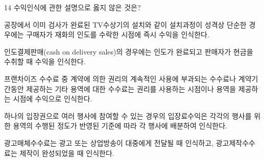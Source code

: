 \begin{question}{14}
수익인식에 관한 설명으로 옳지 않은 것은?
\begin{choices}
  \item 공장에서 이미 검사가 완료된 TV수상기의 설치와 같이 설치과정이 성격상 단순한 경우에는 구매자가 재화의 인도를 수락한 시점에 즉시 수익을 인식한다.
  \item 인도결제판매(cash on delivery sales)의 경우에는 인도가 완료되고 판매자가 현금을 수취할 때 수익을 인식한다.
  \item 프랜차이즈 수수료 중 계약에 의한 권리의 계속적인 사용에 부과되는 수수료나 계약기간동안 제공하는 기타 용역에 대한 수수료는 권리를 사용하는 시점이나 용역을 제공하는 시점에 수익으로 인식한다.
  \item 하나의 입장권으로 여러 행사에 참여할 수 있는 경우의 입장료수익은 각각의 행사를 위한 용역의 수행된 정도가 반영된 기준에 따라 각 행사에 배분하여 인식한다.
  \item 광고매체수수료는 광고 또는 상업방송이 대중에게 전달될 때 인식하고, 광고제작수수료는 제작이 완성되었을 때 인식한다.
\end{choices}
\end{question}
